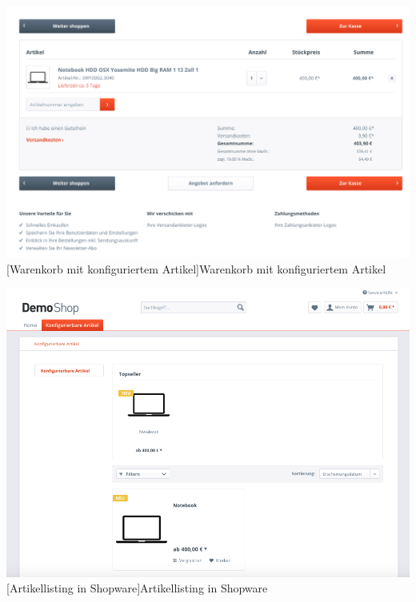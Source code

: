 \begin{appendix}
\vspace{1em}
\begin{minipage}{\linewidth}
	\centering
	\includegraphics[width=1\linewidth]{Abbildungen/shopwareNotebookWarenkorb.png}
	[Warenkorb mit konfiguriertem Artikel]{Warenkorb mit konfiguriertem Artikel}
	\label{app:shopwareNotebookWarenkorb}
\end{minipage}
\vspace{1em}

\vspace{1em}
\begin{minipage}{\linewidth}
	\centering
	\includegraphics[width=1\linewidth]{Abbildungen/shopwareArtikelListing.png}
	[Artikellisting in Shopware]{Artikellisting in Shopware}
	\label{app:shopwareArtikelListing}
\end{minipage}
\vspace{1em}


\end{appendix}
